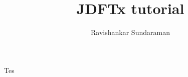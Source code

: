 \documentclass[a4paper,10pt]{article}
\begin{document}
\title{JDFTx tutorial}
\author{Ravishankar Sundaraman}
\date{}
\maketitle


Tes


\end{document}

